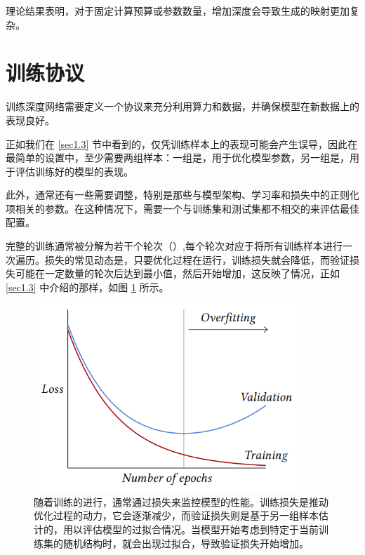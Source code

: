 理论结果表明，对于固定计算预算或参数数量，增加深度会导致生成的映射更加复杂\citep{1602.04485}。

\section{训练协议}\label{sec3.7}

训练深度网络需要定义一个协议来充分利用算力和数据，并确保模型在新数据上的表现良好。

正如我们在 \ref{sec1.3} 节中看到的，仅凭训练样本上的表现可能会产生误导，因此在最简单的设置中，至少需要两组样本：一组是，用于优化模型参数，另一组是，用于评估训练好的模型的表现。

此外，通常还有一些需要调整，特别是那些与模型架构、学习率和损失中的正则化项相关的参数。在这种情况下，需要一个与训练集和测试集都不相交的来评估最佳配置。

完整的训练通常被分解为若干个轮次（）,每个轮次对应于将所有训练样本进行一次遍历。损失的常见动态是，只要优化过程在运行，训练损失就会降低，而验证损失可能在一定数量的轮次后达到最小值，然后开始增加，这反映了情况，正如 \ref{sec1.3} 中介绍的那样，如图 \ref{fig3.5} 所示。

\begin{figure}
    \centering
    \includegraphics[width=0.9\textwidth]{fig/fig3.5.png}
    \caption[训练损失和验证损失]{随着训练的进行，通常通过损失来监控模型的性能。训练损失是推动优化过程的动力，它会逐渐减少，而验证损失则是基于另一组样本估计的，用以评估模型的过拟合情况。当模型开始考虑到特定于当前训练集的随机结构时，就会出现过拟合，导致验证损失开始增加。}
    \label{fig3.5}
\end{figure}

